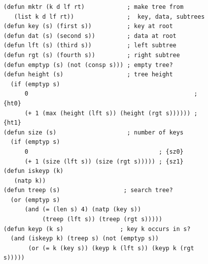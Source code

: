 \begin{figure}
\begin{center}
\begin{code}
\begin{verbatim}
(defun mktr (k d lf rt)            ; make tree from
   (list k d lf rt))               ;  key, data, subtrees
(defun key (s) (first s))          ; key at root
(defun dat (s) (second s))         ; data at root
(defun lft (s) (third s))          ; left subtree
(defun rgt (s) (fourth s))         ; right subtree
(defun emptyp (s) (not (consp s))) ; empty tree?
(defun height (s)                  ; tree height
  (if (emptyp s)
      0                                               ; {ht0}
      (+ 1 (max (height (lft s)) (height (rgt s)))))) ; {ht1}
(defun size (s)                    ; number of keys
  (if (emptyp s)
      0                                     ; {sz0}
      (+ 1 (size (lft s)) (size (rgt s))))) ; {sz1}
(defun iskeyp (k)
   (natp k))
(defun treep (s)                  ; search tree?
  (or (emptyp s)
      (and (= (len s) 4) (natp (key s))
           (treep (lft s)) (treep (rgt s)))))
(defun keyp (k s)                ; key k occurs in s?
  (and (iskeyp k) (treep s) (not (emptyp s))
       (or (= k (key s)) (keyp k (lft s)) (keyp k (rgt s)))))
\end{verbatim}
\end{code}
\end{center}

\end{figure}
